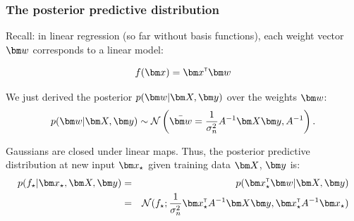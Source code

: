 \begin{frame}
\frametitle{The posterior predictive distribution}
Recall: in linear regression (so far without basis functions), each weight vector $\bw$ corresponds to a linear model:

\vspace*{-0.2cm}
\renewcommand\theequation{2.\thedefcounter}
\setcounter{defcounter}{1}
\begin{equation}
f(\bx) = \bx\transpose \bw
\end{equation}
\vspace*{0.1cm}

We just derived the posterior $p(\bw|\bX, \by)$ over the weights $\bw$: \renewcommand\theequation{2.\thedefcounter}
\setcounter{defcounter}{7}
\begin{equation}
p(\bw|\bX, \by) \sim \norm\left(\bar{\bw} = \frac{1}{\sigma_n^2}A\inv \bX\by, A\inv\right)
\label{eq:posterior_2_7}.
\end{equation}

\pause
\vspace*{0.3cm}
Gaussians are closed under linear maps. Thus, the posterior predictive distribution at new input $\bx_{\star}$ given training data $\bX$, $\by$ is:
%
\vspace*{-0.3cm}
\renewcommand\theequation{2.\thedefcounter}
\setcounter{defcounter}{9}
\begin{eqnarray}
\label{eq:posterior_pred_dist}
\nonumber{}p(f_{\star} |\bx_{\star}, \bX, \by)
& = & p(\bx_{\star}\transpose \bw|\bX, \by)\\
& = & \norm(f_{\star}; \frac{1}{\sigma_n^2} \bx_{\star}\transpose A\inv \bX \by,
\bx_{\star}\transpose A\inv \bx_{\star} )
%
\end{eqnarray}

%

\end{frame}


